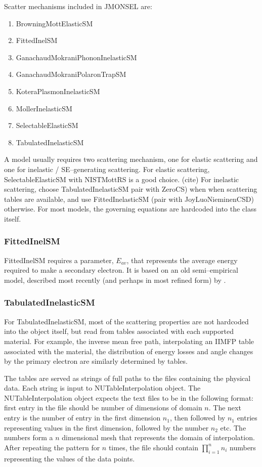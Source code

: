 Scatter mechanisms included in JMONSEL are:
\begin{enumerate}
\item BrowningMottElasticSM
\item FittedInelSM
\item GanachaudMokraniPhononInelasticSM
\item GanachaudMokraniPolaronTrapSM
\item KoteraPlasmonInelasticSM
\item MollerInelasticSM
\item SelectableElasticSM
\item TabulatedInelasticSM
\end{enumerate}

A model usually requires two scattering mechanism, one for elastic scattering and one for inelastic / SE--generating scattering. For elastic scattering, SelectableElasticSM with NISTMottRS is a good choice. (cite) For inelastic scattering, choose TabulatedInelasticSM pair with ZeroCS) when when scattering tables are available, and use FittedInelasticSM (pair with JoyLuoNieminenCSD) otherwise. For most models, the governing equations are hardcoded into the class itself. 

\subsubsection{FittedInelSM}
FittedInelSM requires a parameter, $E_{av}$, that represents the average energy required to make a secondary electron. It is based on an old semi--empirical model, described most recently (and perhaps in most refined form) by \cite{lin2005new}.

\subsubsection{TabulatedInelasticSM}
For TabulatedInelasticSM, most of the scattering properties are not hardcoded into the object itself, but read from tables associated with each supported material. For example, the inverse mean free path, interpolating an IIMFP table associated with the material, the distribution of energy losses and angle changes by the primary electron are similarly determined by tables. 

The tables are served as strings of full paths to the files containing the physical data. Each string is input to NUTableInterpolation object. The NUTableInterpolation object expects the text files to be in the following format: first entry in the file should be number of dimensions of domain $n$. The next entry is the number of entry in the first dimension $n_1$, then followed by $n_1$ entries representing values in the first dimension, followed by the number $n_2$ etc. The numbers form a $n$ dimensional mesh that represents the domain of interpolation. After repeating the pattern for $n$ times, the file should contain $\prod_{i=1}^{n}n_i$ numbers representing the values of the data points. 

